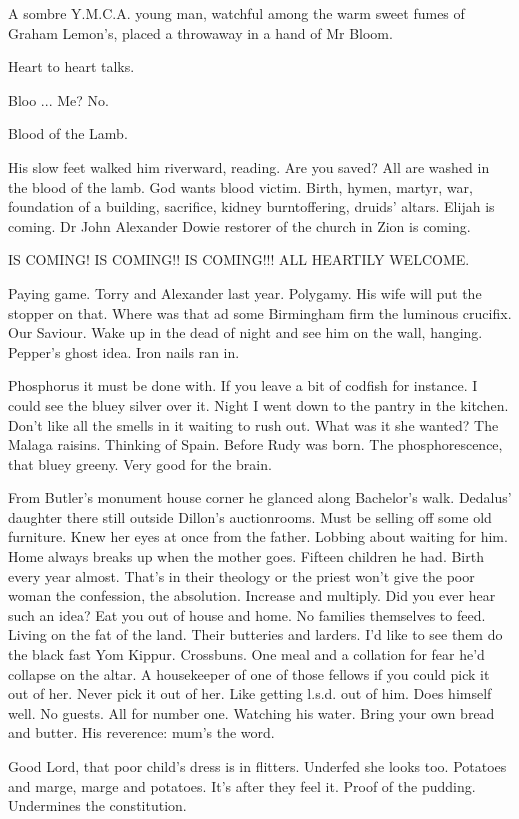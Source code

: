 A sombre Y.M.C.A. young man,
watchful among the warm sweet fumes of Graham Lemon's,
placed a throwaway in a hand of Mr Bloom.

Heart to heart talks.

Bloo ...
Me?
No.

Blood of the Lamb.

His slow feet walked him riverward, reading.
Are you saved?
All are washed in the blood of the lamb.
God wants blood victim.
Birth, hymen, martyr, war,
foundation of a building,
sacrifice,
kidney burntoffering,
druids' altars.
Elijah is coming.
Dr John Alexander Dowie restorer of the church in Zion is coming.


    IS COMING! IS COMING!! IS COMING!!!
    ALL HEARTILY WELCOME.


Paying game.
Torry and Alexander last year.
Polygamy.
His wife will
put the stopper on that.
Where was that ad some Birmingham firm the
luminous crucifix.
Our Saviour.
Wake up in the dead of night and see him
on the wall, hanging.
Pepper's ghost idea.
Iron nails ran in.

Phosphorus it must be done with.
If you leave a bit of codfish for instance.
I could see the bluey silver over it.
Night I went down to the pantry in the kitchen.
Don't like all the smells in it waiting to rush out.
What was it she wanted?
The Malaga raisins.
Thinking of Spain.
Before Rudy was born.
The phosphorescence, that bluey greeny.
Very good for the brain.

From Butler's monument house corner
he glanced along Bachelor's walk.
Dedalus' daughter there still
outside Dillon's auctionrooms.
Must be selling off some old furniture.
Knew her eyes at once from the father.
Lobbing about waiting for him.
Home always breaks up when the mother goes.
Fifteen children he had.
Birth every year almost.
That's in their theology
or the priest won't give the poor woman
the confession,
the absolution.
Increase and multiply.
Did you ever hear such an idea?
Eat you out of house and home.
No families themselves to feed.
Living on the fat of the land.
Their butteries and larders.
I'd like to see them do the
black fast Yom Kippur.
Crossbuns.
One meal and a collation for fear he'd collapse on the altar.
A housekeeper of one of those fellows
if you could pick it out of her.
Never pick it out of her.
Like getting l.s.d. out of him.
Does himself well.
No guests.
All for number one.
Watching his water.
Bring your own bread and butter.
His reverence:
mum's the word.

Good Lord, that poor child's dress is in flitters.
Underfed she looks too.
Potatoes and marge, marge and potatoes.
It's after they feel it.
Proof of the pudding.
Undermines the constitution.

